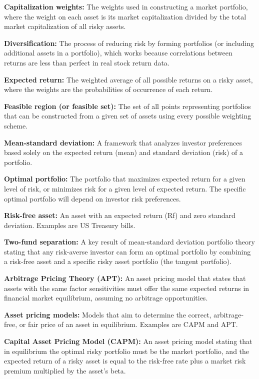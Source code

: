 \documentclass[twoside,openany]{book}
\begin{document}
\textbf{Capitalization weights:} The weights used in constructing a market portfolio, where the weight on each asset is its market capitalization divided by the total market capitalization of all risky assets.

\textbf{Diversification:} The process of reducing risk by forming portfolios (or including additional assets in a portfolio), which works because correlations between returns are less than perfect in real stock return data.

\textbf{Expected return:} The weighted average of all possible returns on a risky asset, where the weights are the probabilities of occurrence of each return.

\textbf{Feasible region (or feasible set):} The set of all points representing portfolios that can be constructed from a given set of assets using every possible weighting scheme.

\textbf{Mean-standard deviation:} A framework that analyzes investor preferences based solely on the expected return (mean) and standard deviation (risk) of a portfolio.

\textbf{Optimal portfolio:} The portfolio that maximizes expected return for a given level of risk, or minimizes risk for a given level of expected return. The specific optimal portfolio will depend on investor risk preferences.

\textbf{Risk-free asset:} An asset with an expected return (Rf) and zero standard deviation. Examples are US Treasury bills.

\textbf{Two-fund separation:} A key result of mean-standard deviation portfolio theory stating that any risk-averse investor can form an optimal portfolio by combining a risk-free asset and a specific risky asset portfolio (the tangent portfolio).

\textbf{Arbitrage Pricing Theory (APT):} An asset pricing model that states that assets with the same factor sensitivities must offer the same expected returns in financial market equilibrium, assuming no arbitrage opportunities.

\textbf{Asset pricing models:} Models that aim to determine the correct, arbitrage-free, or fair price of an asset in equilibrium. Examples are CAPM and APT.

\textbf{Capital Asset Pricing Model (CAPM): } An asset pricing model stating that in equilibrium the optimal risky portfolio must be the market portfolio, and the expected return of a risky asset is equal to the risk-free rate plus a market risk premium multiplied by the asset's beta.
\end{document}
